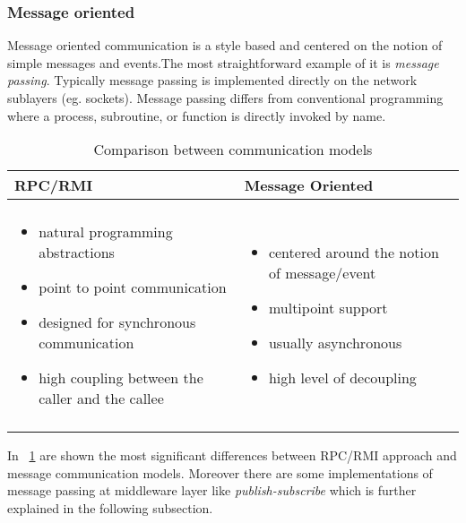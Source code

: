 \subsubsection{Message oriented} \label{messageo} Message oriented communication is a style based and centered on the notion of simple messages and events.The most straightforward example of it is \textit{message passing}. Typically message passing is implemented directly on the network sublayers (eg. sockets). Message passing differs from conventional programming where a process, subroutine, or function is directly invoked by name. 
\begin{table}[h]
	\caption{Comparison between communication models}
	\label{tab:comp}
	\centering
	\begin{tabular}{p{}p{}}
		\toprule
		\textbf{RPC/RMI} & \textbf{Message Oriented} \\
		\midrule
		& \\
	      \begin{minipage}[t]{0.45\textwidth}
	     	\begin{itemize}
	     		\item natural programming abstractions
	     		\item point to point communication
	     		\item designed for synchronous communication
	     		\item high coupling between the caller and the callee
	     	\end{itemize}
	     \end{minipage} &  \begin{minipage}[t]{0.45\textwidth}
	     \begin{itemize}
	     	\item centered around the notion of message/event
	     	\item multipoint support
	     	\item usually asynchronous
	     	\item high level of decoupling
	     \end{itemize}
     \end{minipage} \\
  & \\
		
		\bottomrule
	\end{tabular}
\end{table}
In \tablename~\ref{tab:comp} are shown the most significant differences between RPC/RMI approach and message communication models. Moreover there are some implementations of message passing at middleware layer like \textit{publish-subscribe} which is further explained in the following subsection.


